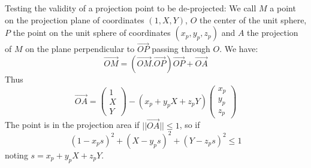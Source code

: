     Testing the validity of a projection point to be de-projected:
    We call
    $M$ a point on the projection plane of coordinates $(1, X, Y)$,
    $O$ the center of the unit sphere,
    $P$ the point on the unit sphere of coordinates $(x_p, y_p, z_p)$ and
    $A$ the projection of $M$ on the plane perpendicular to $\vec{OP}$ passing through $O$.
    We have:
    \begin{equation}
      \vec{OM} = (\vec{OM}.\vec{OP})\vec{OP} + \vec{OA}
    \end{equation}
    Thus
    \begin{equation}
      \vec{OA} =
      \begin{pmatrix}
        1 \\
	X \\
	Y
      \end{pmatrix}
      - (x_p + y_p X + z_p Y)
      \begin{pmatrix}
        x_p \\
	y_p \\
	z_p
      \end{pmatrix}
    \end{equation}
    The point is in the projection area if $||\vec{OA}||\le1$, so if
    \begin{equation}
      (1 - x_p s)^2 + (X - y_p s)^2 + (Y - z_p s)^2 \le 1
    \end{equation}
    noting $s=x_p + y_p X + z_p Y$.


